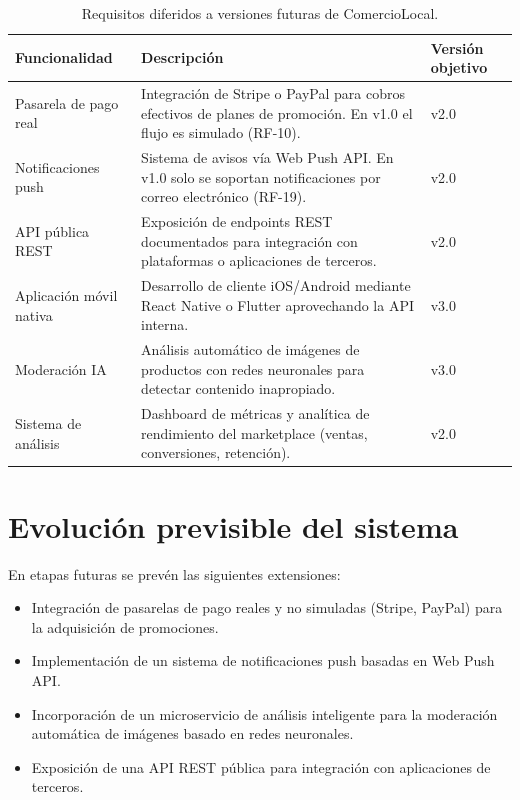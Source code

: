 \documentclass[11pt,a4paper]{report}
\begin{document}
\begin{table}[H]
\centering
\begin{tabularx}{\textwidth}{|l|L|l|}
\hline
{}\color{white}\textbf{Funcionalidad} & \color{white}\textbf{Descripción} & \color{white}\textbf{Versión objetivo} \\ \hline
Pasarela de pago real & Integración de Stripe o PayPal para cobros efectivos de planes de promoción. En v1.0 el flujo es simulado (RF-10). & v2.0 \\ \hline
Notificaciones push & Sistema de avisos vía Web Push API. En v1.0 solo se soportan notificaciones por correo electrónico (RF-19). & v2.0 \\ \hline
API pública REST & Exposición de endpoints REST documentados para integración con plataformas o aplicaciones de terceros. & v2.0 \\ \hline
Aplicación móvil nativa & Desarrollo de cliente iOS/Android mediante React Native o Flutter aprovechando la API interna. & v3.0 \\ \hline
Moderación IA & Análisis automático de imágenes de productos con redes neuronales para detectar contenido inapropiado. & v3.0 \\ \hline
Sistema de análisis & Dashboard de métricas y analítica de rendimiento del marketplace (ventas, conversiones, retención). & v2.0 \\ \hline
\end{tabularx}
\caption{Requisitos diferidos a versiones futuras de ComercioLocal.}
\end{table}

\section{Evolución previsible del sistema}
En etapas futuras se prevén las siguientes extensiones:
\begin{itemize}
    \item Integración de pasarelas de pago reales y no simuladas (Stripe, PayPal) para la adquisición de promociones.
    \item Implementación de un sistema de notificaciones push basadas en Web Push API.
    \item Incorporación de un microservicio de análisis inteligente para la moderación automática de imágenes basado en redes neuronales.
    \item Exposición de una API REST pública para integración con aplicaciones de terceros.
\end{itemize}
\end{document}
